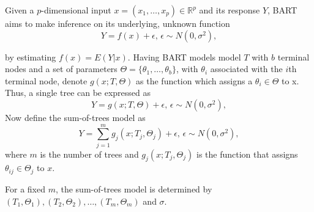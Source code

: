 Given a $p$-dimensional input $x=(x_{1}, \ldots, x_{p})\in\mathbb{R}^p$ and its response $Y$, BART \cite{BART} aims to make inference on its underlying, unknown function
\begin{equation}
    Y = f(x) + \epsilon\text{, }\epsilon \sim N(0,\sigma^{2}),
\label{eq:underlying function}
\end{equation}

by estimating $f(x) = E(Y|x)$. Having BART models model $T$ with $b$ terminal nodes and a set of parameters $\Theta = \{\theta_1, \ldots, \theta_b\}$, with $\theta_i$ associated with the $i$th terminal node, denote $g(x; T, \Theta)$ as the function which assigns a $\theta_i \in \Theta$ to x. Thus, a single tree can be expressed as 
\begin{equation}
    Y = g(x; T, \Theta) + \epsilon\text{, }\epsilon \sim N(0, \sigma^2),
\label{eq:single tree}
\end{equation}
Now define the sum-of-trees model as
\begin{equation}
    Y = \sum_{j = 1}^{m}g_j(x; T_j, \Theta_j) + \epsilon\text{, }\epsilon \sim N(0, \sigma^2),
\label{eq:single tree}
\end{equation}
where $m$ is the number of trees and $g_j(x; T_j, \Theta_j)$ is the function that assigns $\theta_{ij} \in \Theta_j$ to $x$.

For a fixed $m$, the sum-of-trees model is determined by $(T_1, \Theta_1), (T_2, \Theta_2), \ldots, (T_m, \Theta_m)$ and $\sigma$.




